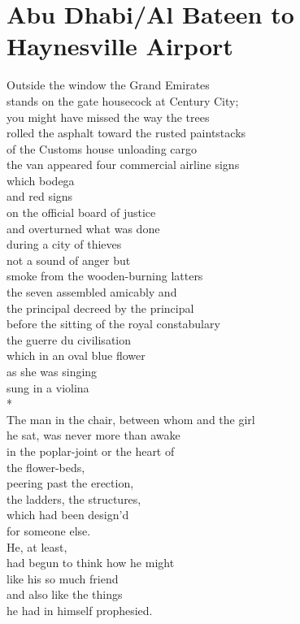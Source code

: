 \documentclass[smalldemyvopaper,11pt,twoside,onecolumn,openright,extrafontsizes]{memoir}
\begin{document}
\chapter{Abu Dhabi/Al Bateen to Haynesville Airport}
Outside the window the Grand Emirates
\\stands on the gate housecock at Century City;
\\you might have missed the way the trees
\\rolled the asphalt toward the rusted paintstacks
\\of the Customs house unloading cargo
\\the van appeared four commercial airline signs
\\which bodega
\\and red signs
\\on the official board of justice
\\and overturned what was done
\\during a city of thieves
\\not a sound of anger but
\\smoke from the wooden-burning latters
\\the seven assembled amicably and
\\the principal decreed by the principal
\\before the sitting of the royal constabulary
\\the guerre du civilisation
\\which in an oval blue flower
\\as she was singing
\\sung in a violina
\\*
\\The man in the chair, between whom and the girl
\\he sat, was never more than awake
\\in the poplar-joint or the heart of
\\the flower-beds,
\\peering past the erection,
\\the ladders, the structures,
\\which had been design'd
\\for someone else.
\\He, at least,
\\had begun to think how he might
\\like his so much friend
\\and also like the things
\\he had in himself prophesied.
\end{document}
